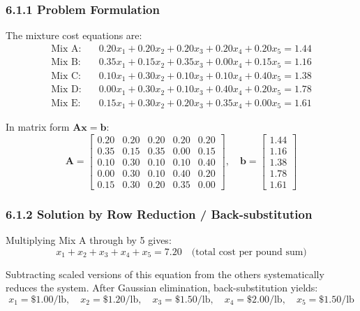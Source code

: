 \documentclass[12pt,a4paper]{article}
\begin{document}
\subsubsection{6.1.1 Problem Formulation}

The mixture cost equations are:
\begin{align*}
\text{Mix A:} & \quad 0.20x_1 + 0.20x_2 + 0.20x_3 + 0.20x_4 + 0.20x_5 = 1.44 \\
\text{Mix B:} & \quad 0.35x_1 + 0.15x_2 + 0.35x_3 + 0.00x_4 + 0.15x_5 = 1.16 \\
\text{Mix C:} & \quad 0.10x_1 + 0.30x_2 + 0.10x_3 + 0.10x_4 + 0.40x_5 = 1.38 \\
\text{Mix D:} & \quad 0.00x_1 + 0.30x_2 + 0.10x_3 + 0.40x_4 + 0.20x_5 = 1.78 \\
\text{Mix E:} & \quad 0.15x_1 + 0.30x_2 + 0.20x_3 + 0.35x_4 + 0.00x_5 = 1.61
\end{align*}

In matrix form $\mathbf{A}\mathbf{x} = \mathbf{b}$:
\[
\mathbf{A} = \begin{bmatrix}
  0.20 & 0.20 & 0.20 & 0.20 & 0.20 \\
  0.35 & 0.15 & 0.35 & 0.00 & 0.15 \\
  0.10 & 0.30 & 0.10 & 0.10 & 0.40 \\
  0.00 & 0.30 & 0.10 & 0.40 & 0.20 \\
  0.15 & 0.30 & 0.20 & 0.35 & 0.00
\end{bmatrix},
\quad
\mathbf{b} = \begin{bmatrix} 1.44 \\ 1.16 \\ 1.38 \\ 1.78 \\ 1.61 \end{bmatrix}
\]

\subsubsection{6.1.2 Solution by Row Reduction / Back-substitution}

Multiplying Mix A through by 5 gives:
\[
x_1 + x_2 + x_3 + x_4 + x_5 = 7.20 \quad \text{(total cost per pound sum)}
\]

Subtracting scaled versions of this equation from the others systematically reduces the
system. After Gaussian elimination, back-substitution yields:
\[
\boxed{x_1 = \$1.00/\text{lb},\quad x_2 = \$1.20/\text{lb},\quad x_3 = \$1.50/\text{lb},\quad x_4 = \$2.00/\text{lb},\quad x_5 = \$1.50/\text{lb}}
\]
\end{document}

